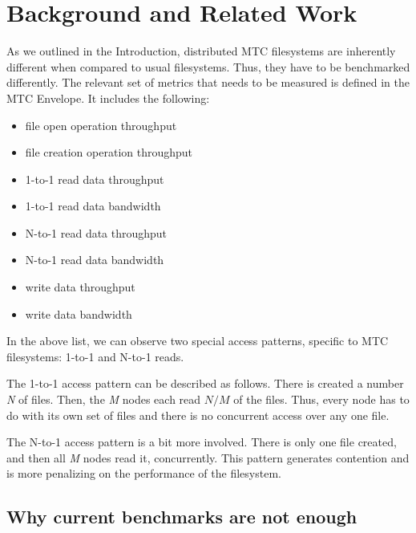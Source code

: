 
\chapter{Background and Related Work} %

\label{Chapter2} %



As we outlined in the Introduction, distributed MTC filesystems are inherently different when compared to usual filesystems. Thus, they have to be benchmarked differently. The relevant set of metrics that needs to be measured is defined in the MTC Envelope\cite{envelope}. It includes the following:

\begin{itemize}

\item file open operation throughput
\item file creation operation throughput
\item 1-to-1 read data throughput
\item 1-to-1 read data bandwidth
\item N-to-1 read data throughput
\item N-to-1 read data bandwidth
\item write data throughput
\item write data bandwidth

\end{itemize}

In the above list, we can observe two special access patterns, specific to MTC filesystems: 1-to-1 and N-to-1 reads.

The 1-to-1 access pattern can be described as follows. There is created a number \textit{N} of files. Then, the \textit{M} nodes each read $N / M$ of the files. Thus, every node has to do with its own set of files and there is no concurrent access over any one file.

The N-to-1 access pattern is a bit more involved. There is only one file created, and then all \textit{M} nodes read it, concurrently. This pattern generates contention and is more penalizing on the performance of the filesystem.

\section{Why current benchmarks are not enough}

